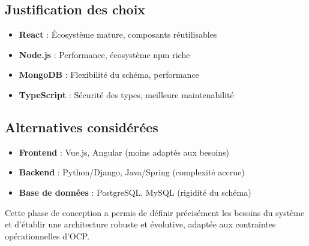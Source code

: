 \subsection{Justification des choix}
\begin{itemize}
    \item \textbf{React} : Écosystème mature, composants réutilisables
    \item \textbf{Node.js} : Performance, écosystème npm riche
    \item \textbf{MongoDB} : Flexibilité du schéma, performance
    \item \textbf{TypeScript} : Sécurité des types, meilleure maintenabilité
\end{itemize}

\subsection{Alternatives considérées}
\begin{itemize}
    \item \textbf{Frontend} : Vue.js, Angular (moins adaptés aux besoins)
    \item \textbf{Backend} : Python/Django, Java/Spring (complexité accrue)
    \item \textbf{Base de données} : PostgreSQL, MySQL (rigidité du schéma)
\end{itemize}

Cette phase de conception a permis de définir précisément les besoins du système et d'établir une architecture robuste et évolutive, adaptée aux contraintes opérationnelles d'OCP.
